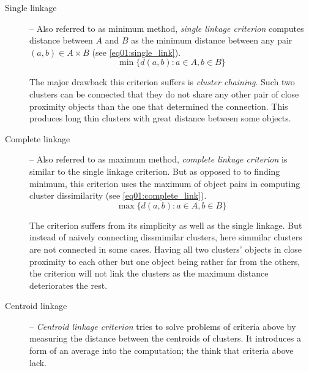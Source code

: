 \begin{description}
	\item[Single linkage] -- Also referred to as minimum method, \emph{single linkage criterion} computes distance between $A$ and $B$ as the minimum distance between any pair $(a,b) \in A\times B$ (see \ref{eq01:single_link}).
	\begin{equation}\label{eq01:single_link}
	\min\{d(a,b) : a \in A, b \in B\}
	\end{equation}
	
	The major drawback this criterion suffers is \emph{cluster chaining}. Such two clusters can be connected that they do not share any other pair of close proximity objects than the one that determined the connection. This produces long thin clusters with great distance between some objects.
	
	\item[Complete linkage] -- Also referred to as maximum method, \emph{complete linkage criterion} is similar to the single linkage criterion. But as opposed to to finding minimum, this criterion uses the maximum of object pairs in computing cluster dissimilarity (see \ref{eq01:complete_link}). 
	\begin{equation}\label{eq01:complete_link}
	\max\{d(a,b) : a \in A, b \in B\}
	\end{equation}
	
	The criterion suffers from its simplicity as well as the single linkage. But instead of naively connecting dissmimilar clusters, here simmilar clusters are not connected in some cases. Having all two clusters' objects in close proximity to each other but one object being rather far from the others, the criterion will not link the clusters as the maximum distance deteriorates the rest.
	
	\item[Centroid linkage] -- \emph{Centroid linkage criterion} tries to solve problems of criteria above by measuring the distance between the centroids of clusters. It introduces a form of an average into the computation; the think that criteria above lack.
\end{description}

